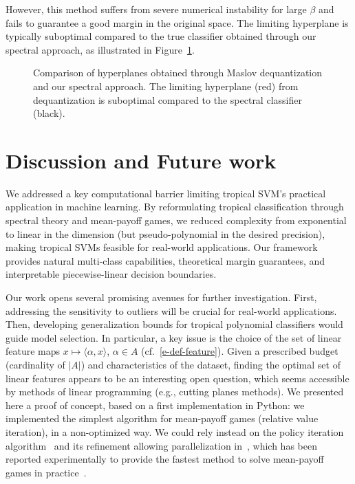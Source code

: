 \documentclass{article}
\def\<#1,#2>{\langle #1,#2\rangle}
\begin{document}
However, this method suffers from severe numerical instability for large $\beta$ and fails to guarantee a good margin in the original space. The limiting hyperplane is typically suboptimal compared to the true classifier obtained through our spectral approach, as illustrated in Figure~\ref{fig:maslov_dequantization}.

\begin{figure}[h]
    \centering
    \resizebox{0.5\textwidth}{!}{\clipbox{0.15\width{} 0.15\height{} 0.15\width{} 0.15\height{}}{}}
    \caption{Comparison of hyperplanes obtained through Maslov dequantization and our spectral approach. The limiting hyperplane (red) from dequantization is suboptimal compared to the spectral classifier (black).}
    \label{fig:maslov_dequantization}
\end{figure}

\section{Discussion and Future work}\label{sec:discussion}

We addressed a key computational barrier limiting tropical SVM's practical application in machine learning. By reformulating tropical classification through spectral theory and mean-payoff games, we reduced complexity from exponential to linear in the dimension (but pseudo-polynomial in the desired precision),
making tropical SVMs feasible for real-world applications.
Our framework provides natural multi-class capabilities, theoretical margin guarantees, and interpretable piecewise-linear decision boundaries.

Our work opens several promising avenues for further investigation. First, addressing the sensitivity to outliers will be crucial for real-world applications. Then, developing generalization bounds for tropical polynomial classifiers would guide model selection. In particular, a key issue is the choice of the set of linear feature maps $x\mapsto \<\alpha,x>$, $\alpha\in A$ (cf.\ \eqref{e-def-feature}). Given a prescribed budget (cardinality of $|A|$) and characteristics
of the dataset, finding the optimal set of linear features
appears to be an interesting open question, which seems accessible
by methods of linear programming (e.g., cutting planes methods).
We presented here a proof of concept, based on a first implementation in Python: we implemented the simplest algorithm for mean-payoff games
(relative value iteration), in a non-optimized way. We could rely instead on the policy iteration algorithm~\cite{DG-06} and its refinement allowing parallelization in~\cite{chaloupkathesis}, which has been reported experimentally to provide the fastest method to solve mean-payoff
games in practice~\cite{chaloupka}.
\end{document}

